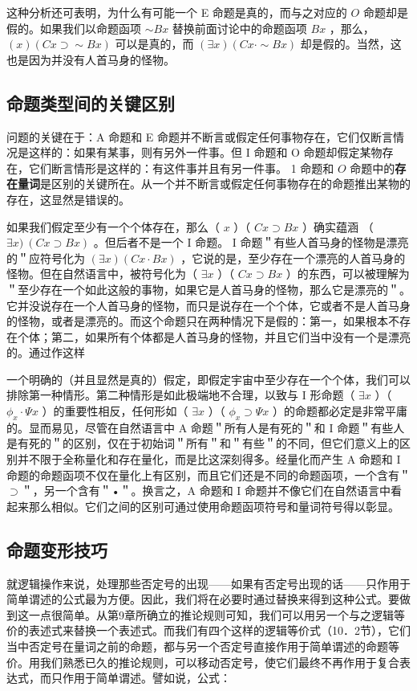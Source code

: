 这种分析还可表明，为什么有可能一个 E 命题是真的，而与之对应的 $O$ 命题却是假的。如果我们以命题函项 $\sim B x$ 替换前面讨论中的命题函项 $B x$ ，那么，$(x)(C x \supset \sim B x)$ 可以是真的，而 $(\exists x)(C x \cdot \sim B x)$ 却是假的。当然，这也是因为并没有人首马身的怪物。

\subsection{命题类型间的关键区别}

问题的关键在于：A 命题和 E 命题并不断言或假定任何事物存在，它们仅断言情况是这样的：如果有某事，则有另外一件事。但 I 命题和 O 命题却假定某物存在，它们断言情形是这样的：有这件事并且有另一件事。 1 命题和 $O$ 命题中的\textbf{存在量词}是区别的关键所在。从一个并不断言或假定任何事物存在的命题推出某物的存在，这显然是错误的。

如果我们假定至少有一个个体存在，那么（ $x$ ）（ $C x \supset B x$ ）确实蕴涵 （ $\exists x) ~(C x \supset B x)$ 。但后者不是一个 I 命题。 I 命题＂有些人首马身的怪物是漂亮的＂应符号化为 $(\exists x)(C x \cdot B x)$ ，它说的是，至少存在一个漂亮的人首马身的怪物。但在自然语言中，被符号化为（ $\exists x$ ）（ $C x \supset B x$ ）的东西，可以被理解为＂至少存在一个如此这般的事物，如果它是人首马身的怪物，那么它是漂亮的＂。它并没说存在一个人首马身的怪物，而只是说存在一个个体，它或者不是人首马身的怪物，或者是漂亮的。而这个命题只在两种情况下是假的：第一，如果根本不存在个体；第二，如果所有个体都是人首马身的怪物，并且它们当中没有一个是漂亮的。通过作这样

一个明确的（并且显然是真的）假定，即假定宇宙中至少存在一个个体，我们可以排除第一种情形。第二种情形是如此极端地不合理，以致与 I 形命题（ $\exists x$ ）（ $\phi_{x} \cdot \Psi x$ ）的重要性相反，任何形如（ $\exists x$ ）（ $\phi_{x} \supset \Psi x$ ）的命题都必定是非常平庸的。显而易见，尽管在自然语言中 A 命题＂所有人是有死的＂和 I 命题＂有些人是有死的＂的区别，仅在于初始词＂所有＂和＂有些＂的不同，但它们意义上的区别并不限于全称量化和存在量化，而是比这深刻得多。经量化而产生 A 命题和 I 命题的命题函项不仅在量化上有区别，而且它们还是不同的命题函项，一个含有＂$\supset$＂，另一个含有＂•＂。换言之，A 命题和 I 命题并不像它们在自然语言中看起来那么相似。它们之间的区别可通过使用命题函项符号和量词符号得以彰显。

\subsection{命题变形技巧}

就逻辑操作来说，处理那些否定号的出现——如果有否定号出现的话——只作用于简单谓述的公式最为方便。因此，我们将在必要时通过替换来得到这种公式。要做到这一点很简单。从第9章所确立的推论规则可知，我们可以用另一个与之逻辑等价的表述式来替换一个表述式。而我们有四个这样的逻辑等价式（10．2节），它们当中否定号在量词之前的命题，都与另一个否定号直接作用于简单谓述的命题等价。用我们熟悉已久的推论规则，可以移动否定号，使它们最终不再作用于复合表达式，而只作用于简单谓述。譬如说，公式：

